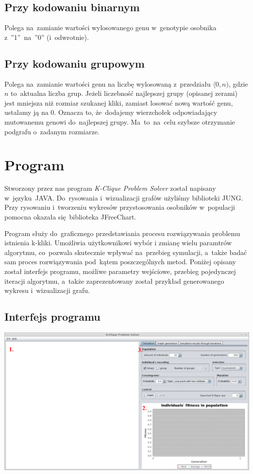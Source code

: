 \documentclass[11pt]{aghdpl}
\begin{document}
\section{Przy kodowaniu binarnym}
\label{sec:kodBin}
Polega na~zamianie wartości wylosowanego genu w~genotypie osobnika z~''1''~na~''0'' (i~odwrotnie). 

\section{Przy kodowaniu grupowym}
\label{sec:kodGru}
Polega na~zamianie wartości genu na liczbę wylosowaną z~przedziału $\langle0, n)$, gdzie $n$ to~aktualna liczba grup. Jeżeli liczebność najlepszej grupy 
(opisanej zerami) jest mniejsza niż rozmiar szukanej kliki, zamiast losować nową wartość genu, ustalamy ją na 0. Oznacza to, że~dodajemy wierzchołek 
odpowiadający mutowanemu genowi do~najlepszej grupy. Ma~to~na~celu szybsze otrzymanie podgrafu o~zadanym rozmiarze.

\chapter{Program}
\label{cha:program}
Stworzony przez nas program \textit{K-Clique Problem Solver} został napisany w~języku~JAVA. Do~rysowania i~wizualizacji grafów użyliśmy biblioteki 
JUNG. Przy rysowaniu i~tworzeniu wykresów przystosowania osobników w~populacji pomocna okazała się~biblioteka JFreeChart. 

Program służy do~graficznego przedstawiania procesu rozwiązywania problemu istnienia k-kliki. Umożliwia użytkownikowi wybór i zmianę wielu
paramtrów algorytmu, co~pozwala skutecznie wpływać na~przebieg symulacji, a~także badać sam proces rozwiązywania pod~kątem poszczególnych metod. Poniżej 
opisany został interfejs programu, możliwe parametry wejściowe, przebieg pojedynczej iteracji algorytmu, a~także zaprezentowany został
przykład generowanego wykresu i~wizualizacji grafu.

\section{Interfejs programu}

\includegraphics[width=16cm]{interfejs}
\end{document}
